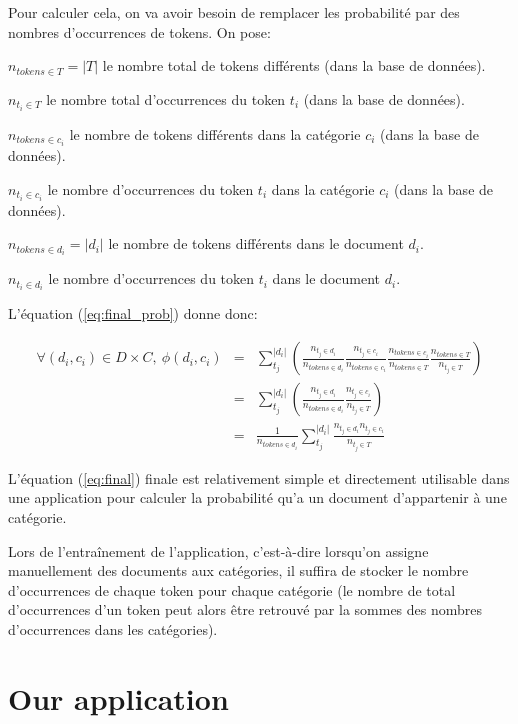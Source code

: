 \documentclass[a4paper,11pt]{article}
\begin{document}
Pour calculer cela, on va avoir besoin de remplacer les probabilité par des
nombres d'occurrences de tokens. On pose:

$n_{tokens \in T} = |T|$ le nombre total de tokens différents (dans la base de
données).

$n_{t_i \in T}$ le nombre total d'occurrences du token $t_i$ (dans la base de
données).

$n_{tokens \in c_i}$ le nombre de tokens différents dans la catégorie $c_i$
(dans la base de données).

$n_{t_i \in c_i}$ le nombre d'occurrences du token $t_i$ dans la catégorie
$c_i$ (dans la base de données).

$n_{tokens \in d_i} = |d_i|$ le nombre de tokens différents dans le document $d_i$.

$n_{t_i \in d_i}$ le nombre d'occurrences du token $t_i$ dans le document
$d_i$.

L'équation (\ref{eq:final_prob}) donne donc:

\begin{eqnarray}\label{eq:final}
    \forall (d_i, c_i) \in D \times C,\ 
    \phi(d_i, c_i)
    &=& \sum_{t_j}^{|d_i|} (
        \frac{n_{t_j \in d_i}}{n_{tokens \in d_i}}
        \frac{n_{t_j \in c_i}}{n_{tokens \in c_i}}
        \frac{n_{tokens \in c_i}}{n_{tokens \in T}}
        \frac{n_{tokens \in T}}{n_{t_j \in T}}
    ) \nonumber \\
    &=& \sum_{t_j}^{|d_i|} (
        \frac{n_{t_j \in d_i}}{n_{tokens \in d_i}}
        \frac{n_{t_j \in c_i}}{n_{t_j \in T}}
    ) \nonumber \\
    &=& \frac{1}{n_{tokens \in d_i}}
        \sum_{t_j}^{|d_i|}
        \frac{n_{t_j \in d_i} n_{t_j \in c_i}}{n_{t_j \in T}}
\end{eqnarray}

L'équation (\ref{eq:final}) finale est relativement simple et directement
utilisable dans une application pour calculer la probabilité qu'a un document
d'appartenir à une catégorie.

Lors de l'entraînement de l'application, c'est-à-dire lorsqu'on assigne
manuellement des documents aux catégories, il suffira de stocker le nombre
d'occurrences de chaque token pour chaque catégorie (le nombre de total
d'occurrences d'un token peut alors être retrouvé par la sommes des nombres
d'occurrences dans les catégories).


\section{Our application}
\end{document}
